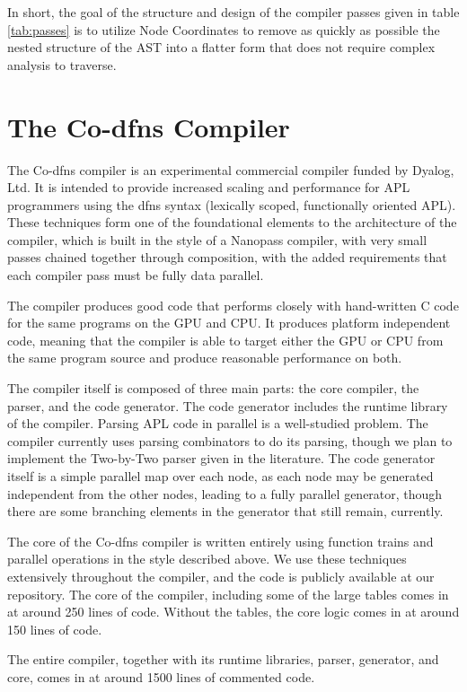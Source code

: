 \documentclass[numbers,preprint]{sigplanconf}
\begin{document}
In short, the goal of the structure and design of the compiler passes
given in table \ref{tab:passes} is to utilize Node Coordinates to
remove as quickly as possible the nested structure of the AST into
a flatter form that does not require complex analysis to traverse.

\section{The Co-dfns Compiler}

The Co-dfns compiler is an experimental commercial compiler funded by 
Dyalog, Ltd. It is intended to provide increased scaling and performance
for APL programmers using the dfns syntax (lexically scoped, functionally 
oriented APL). These techniques form one of the foundational elements to 
the architecture of the compiler, which is built in the style of a Nanopass 
compiler, with very small passes chained together through composition, with 
the added requirements that each compiler pass must be fully data parallel. 

The compiler produces good code that performs closely with hand-written 
C code for the same programs on the GPU and CPU. It produces platform 
independent code, meaning that the compiler is able to target either the 
GPU or CPU from the same program source and produce reasonable performance 
on both. 

The compiler itself is composed of three main parts: the core compiler, 
the parser, and the code generator. The code generator includes the runtime 
library of the compiler. Parsing APL code in parallel is a well-studied 
problem. The compiler currently uses parsing combinators to do its parsing, 
though we plan to implement the Two-by-Two parser given in the literature. 
The code generator itself is a simple parallel map over each node, as 
each node may be generated independent from the other nodes, leading to a 
fully parallel generator, though there are some branching elements in the 
generator that still remain, currently. 

The core of the Co-dfns compiler is written entirely using function trains 
and parallel operations in the style described above. We use these techniques 
extensively throughout the compiler, and the code is publicly available 
at our repository. The core of the compiler, including some of the large 
tables comes in at around 250 lines of code. Without the tables, the core 
logic comes in at around 150 lines of code. 

The entire compiler, together with its runtime libraries, parser, generator, 
and core, comes in at around 1500 lines of commented code. 
\end{document}
